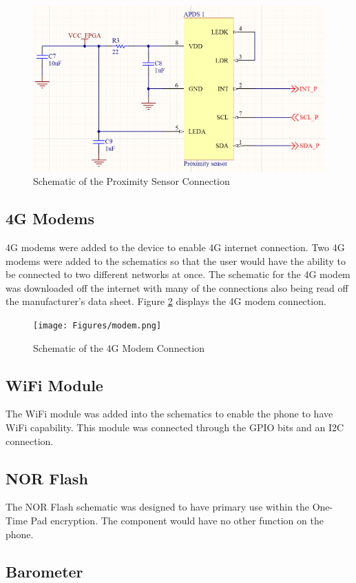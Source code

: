 \begin{figure}
	\includegraphics[width=0.5\linewidth]{Figures/prox.png}\centering
	\caption{Schematic of the Proximity Sensor Connection}
	\label{fig:prox}
\end{figure}

\subsection{4G Modems}
\label{chap:modem}

	4G modems were added to the device to enable 4G internet connection. 
Two 4G modems were added to the schematics so that the user would have the ability to be connected to two different networks at once.
The schematic for the 4G modem was downloaded off the internet with many of the connections also being read off the manufacturer's data sheet. 
Figure \ref{fig:modem} displays the 4G modem connection. 

\begin{figure}
	\texttt{[image: Figures/modem.png]}\centering
	\caption{Schematic of the 4G Modem Connection}
	\label{fig:modem}
\end{figure}

\subsection{WiFi Module}

	The WiFi module was added into the schematics to enable the phone to have WiFi capability. This module was connected through the GPIO bits and an I2C connection.

\subsection{NOR Flash}

	The NOR Flash schematic was designed to have primary use within the One-Time Pad encryption. The component would have no other function on the phone. 

\subsection{Barometer}

